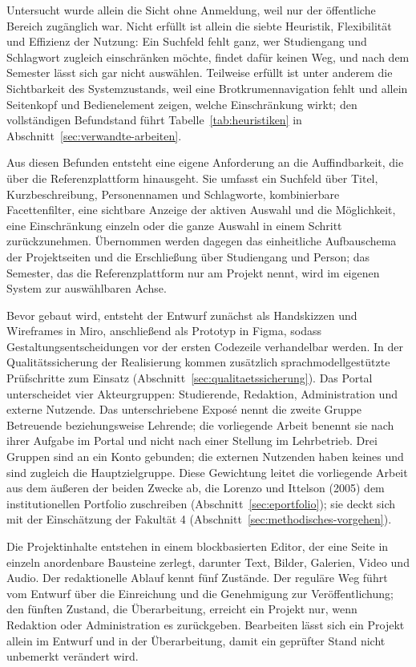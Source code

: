 Untersucht wurde allein die Sicht ohne Anmeldung, weil nur der öffentliche Bereich zugänglich war. Nicht erfüllt ist allein die siebte Heuristik, Flexibilität und Effizienz der Nutzung: Ein Suchfeld fehlt ganz, wer Studiengang und Schlagwort zugleich einschränken möchte, findet dafür keinen Weg, und nach dem Semester lässt sich gar nicht auswählen. Teilweise erfüllt ist unter anderem die Sichtbarkeit des Systemzustands, weil eine Brotkrumennavigation fehlt und allein Seitenkopf und Bedienelement zeigen, welche Einschränkung wirkt; den vollständigen Befundstand führt Tabelle~\ref{tab:heuristiken} in Abschnitt~\ref{sec:verwandte-arbeiten}.

Aus diesen Befunden entsteht eine eigene Anforderung an die Auffindbarkeit, die über die Referenzplattform hinausgeht. Sie umfasst ein Suchfeld über Titel, Kurzbeschreibung, Personennamen und Schlagworte, kombinierbare Facettenfilter, eine sichtbare Anzeige der aktiven Auswahl und die Möglichkeit, eine Einschränkung einzeln oder die ganze Auswahl in einem Schritt zurückzunehmen. Übernommen werden dagegen das einheitliche Aufbauschema der Projektseiten und die Erschließung über Studiengang und Person; das Semester, das die Referenzplattform nur am Projekt nennt, wird im eigenen System zur auswählbaren Achse.

Bevor gebaut wird, entsteht der Entwurf zunächst als Handskizzen und Wireframes in Miro, anschließend als Prototyp in Figma, sodass Gestaltungsentscheidungen vor der ersten Codezeile verhandelbar werden. In der Qualitätssicherung der Realisierung kommen zusätzlich sprachmodellgestützte Prüfschritte zum Einsatz (Abschnitt~\ref{sec:qualitaetssicherung}). Das Portal unterscheidet vier Akteurgruppen: Studierende, Redaktion, Administration und externe Nutzende. Das unterschriebene Exposé nennt die zweite Gruppe Betreuende beziehungsweise Lehrende; die vorliegende Arbeit benennt sie nach ihrer Aufgabe im Portal und nicht nach einer Stellung im Lehrbetrieb. Drei Gruppen sind an ein Konto gebunden; die externen Nutzenden haben keines und sind zugleich die Hauptzielgruppe. Diese Gewichtung leitet die vorliegende Arbeit aus dem äußeren der beiden Zwecke ab, die Lorenzo und Ittelson (2005) dem institutionellen Portfolio zuschreiben (Abschnitt~\ref{sec:eportfolio}); sie deckt sich mit der Einschätzung der Fakultät 4 (Abschnitt~\ref{sec:methodisches-vorgehen}).

Die Projektinhalte entstehen in einem blockbasierten Editor, der eine Seite in einzeln anordenbare Bausteine zerlegt, darunter Text, Bilder, Galerien, Video und Audio. Der redaktionelle Ablauf kennt fünf Zustände. Der reguläre Weg führt vom Entwurf über die Einreichung und die Genehmigung zur Veröffentlichung; den fünften Zustand, die Überarbeitung, erreicht ein Projekt nur, wenn Redaktion oder Administration es zurückgeben. Bearbeiten lässt sich ein Projekt allein im Entwurf und in der Überarbeitung, damit ein geprüfter Stand nicht unbemerkt verändert wird.

